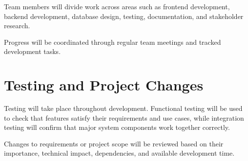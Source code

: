 Team members will divide work across areas such as frontend development, backend development, database design, testing, documentation, and stakeholder research.

Progress will be coordinated through regular team meetings and tracked development tasks.

\section{Testing and Project Changes}

Testing will take place throughout development. Functional testing will be used to check that features satisfy their requirements and use cases, while integration testing will confirm that major system components work together correctly.

Changes to requirements or project scope will be reviewed based on their importance, technical impact, dependencies, and available development time. 

